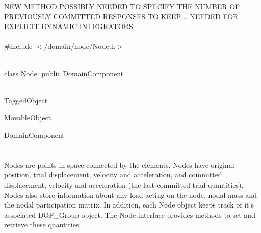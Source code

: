 
NEW METHOD POSSIBLY NEEDED TO SPECIFY THE NUMBER OF PREVIOUSLY
COMMITTED RESPONSES TO KEEP .. NEEDED FOR EXPLICIT DYNAMIC INTEGRATORS\\

   \\
\#include $<$/domain/node/Node.h$>$  


  \\
class Node: public DomainComponent  


 \\
TaggedObject 

MovableObject 

\indent\indent DomainComponent \\
\indent\indent{} \\

  \\
\indent Nodes are points in space connected by the elements. Nodes
have original position, trial displacement, velocity and acceleration, 
and committed displacement, velocity and acceleration (the last
committed trial quantities). Nodes also store information about any
load acting on the node, nodal mass and the nodal participation
matrix. In addition, each Node object keeps track of it's associated
DOF\_Group object. The Node interface provides methods to set and
retrieve these quantities.\\  


